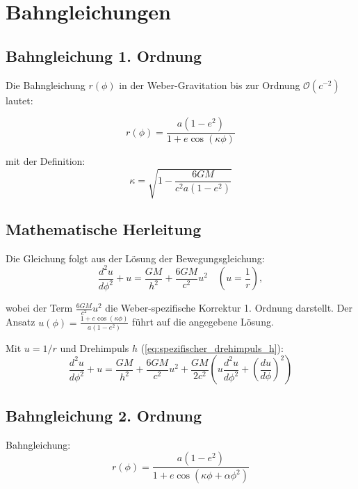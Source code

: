 \section{Bahngleichungen}
\subsection{Bahngleichung 1. Ordnung}
Die Bahngleichung \(r(\phi)\) in der Weber-Gravitation bis zur Ordnung \(\mathcal{O}(c^{-2})\) lautet:

\begin{equation}
\label{eq:bahngleichung_1_ordnung}
\boxed
{
    r(\phi) = \frac{a(1 - e^2)}{1 + e \cos\left(\kappa\phi\right)}
}
\end{equation}

\noindent mit der Definition:
\begin{equation}
\label{eq:kappa_1_ordnung}
\boxed
{
    \kappa = \sqrt{1 - \frac{6GM}{c^2a(1 - e^2)}}    
}
\end{equation}

\subsection*{Mathematische Herleitung}
Die Gleichung folgt aus der Lösung der Bewegungsgleichung:
\begin{equation}
\frac{d^2u}{d\phi^2} + u = \frac{GM}{h^2} + \frac{6GM}{c^2} u^2 \quad \left(u = \frac{1}{r}\right),
\end{equation}

wobei der Term \(\frac{6GM}{c^2} u^2\) die Weber-spezifische Korrektur 1. Ordnung darstellt. Der Ansatz \(u(\phi) = \frac{1 + e \cos(\kappa\phi)}{a(1 - e^2)}\) führt auf die angegebene Lösung.

Mit $u=1/r$ und Drehimpuls $h$ (\ref{eq:spezifischer_drehimpuls_h}):
\begin{equation}
\frac{d^2u}{d\phi^2} + u = \frac{GM}{h^2} + \frac{6GM}{c^2}u^2 + \frac{GM}{2c^2}\left(u\frac{d^2u}{d\phi^2} + \left(\frac{du}{d\phi}\right)^2\right)
\end{equation}

\subsection{Bahngleichung 2. Ordnung}
Bahngleichung:
\begin{equation}
\label{eq:bahngleichung_2_ordnung}
    \boxed
    {
        r(\phi) = \frac{a(1-e^2)}{1 + e\cos\left(\kappa\phi + \alpha\phi^2\right)}
    }
\end{equation}

